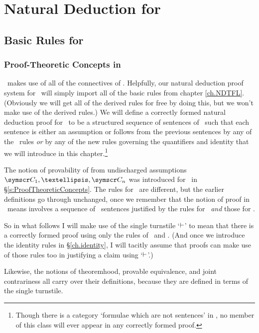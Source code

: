 \part{Natural Deduction for \FOL}
\label{ch.NDFOL}

\chapter{Basic Rules for \textnormal{\FOL}}\label{s:BasicFOL}

\section{Proof-Theoretic Concepts in \FOL}



\FOL\ makes use of all of the connectives of \TFL. Helpfully, our natural deduction proof system for \FOL\ will simply import all of the basic rules from chapter \ref{ch.NDTFL}. (Obviously we will get all of the derived rules for free by doing this, but we won't make use of the derived rules.) We will define a correctly formed natural deduction proof for \FOL\ to be a structured sequence of sentences of \FOL\ such that each sentence is either an assumption or follows from the previous sentences by any of the \TFL\ rules \emph{or} by any of the new rules governing the quantifiers and identity that we will introduce in this chapter.\footnote{Though there is a category `formulae which are not sentences' in \FOL, no member of this class will ever appear in any correctly formed proof.} 

The notion of provability of  from undischarged assumptions $\meta{C}_{1},…,\meta{C}_{n}$ was introduced for \TFL\ in §\ref{s:ProofTheoreticConcepts}. The rules for \FOL\ are different, but the earlier definitions go through unchanged, once we remember that the notion of proof in \FOL\ means involves a sequence of \FOL\ sentences justified by the rules for \TFL\ \emph{and} those for \FOL. 

So in what follows I will make use of the single turnstile `$\vdash$' to mean that there is a correctly formed proof using only the rules of \TFL\ and \FOL. (And once we introduce the identity rules in §\ref{ch.identity}, I will tacitly assume that proofs can make use of those rules too in justifying a claim using `$\vdash$'.) 

Likewise, the notions of theoremhood, provable equivalence, and joint contrariness all carry over their definitions, because they are defined in terms of the single turnstile.


